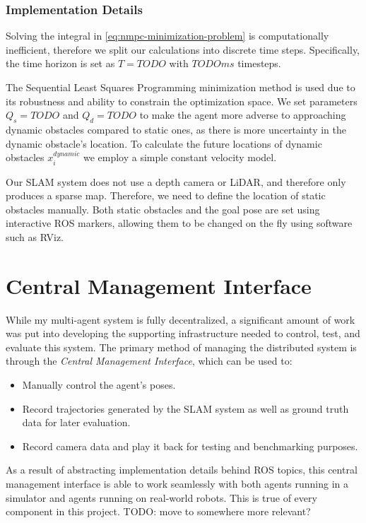 \subsubsection{Implementation Details}
\label{sec:nmpc-implementation-details}
Solving the integral in \autoref{eq:nmpc-minimization-problem} is computationally inefficient, therefore we split our calculations into discrete time steps. Specifically, the time horizon is set as $T=TODO$ with $TODOms$ timesteps.

The Sequential Least Squares Programming minimization method is used due to its robustness and ability to constrain the optimization space. We set parameters $Q_s = TODO$ and $Q_d = TODO$ to make the agent more adverse to approaching dynamic obstacles compared to static ones, as there is more uncertainty in the dynamic obstacle's location. To calculate the future locations of dynamic obstacles $x_i^{dynamic}$ we employ a simple constant velocity model.

Our SLAM system does not use a depth camera or LiDAR, and therefore only produces a sparse map. Therefore, we need to define the location of static obstacles manually. Both static obstacles and the goal pose are set using interactive ROS markers, allowing them to be changed on the fly using software such as RViz.

\section{Central Management Interface}
\label{sec:central-management-interface}
While my multi-agent system is fully decentralized, a significant amount of work was put into developing the supporting infrastructure needed to control, test, and evaluate this system. The primary method of managing the distributed system is through the \textit{Central Management Interface}, which can be used to: \noparskip
\smallbreak
{
    \begin{itemize}[noitemsep]
        \item Manually control the agent's poses.
        \item Record trajectories generated by the SLAM system as well as ground truth data for later evaluation.
        \item Record camera data and play it back for testing and benchmarking purposes.
    \end{itemize}
}

As a result of abstracting implementation details behind ROS topics, this central management interface is able to work seamlessly with both agents running in a simulator and agents running on real-world robots. This is true of every component in this project. TODO: move to somewhere more relevant?

